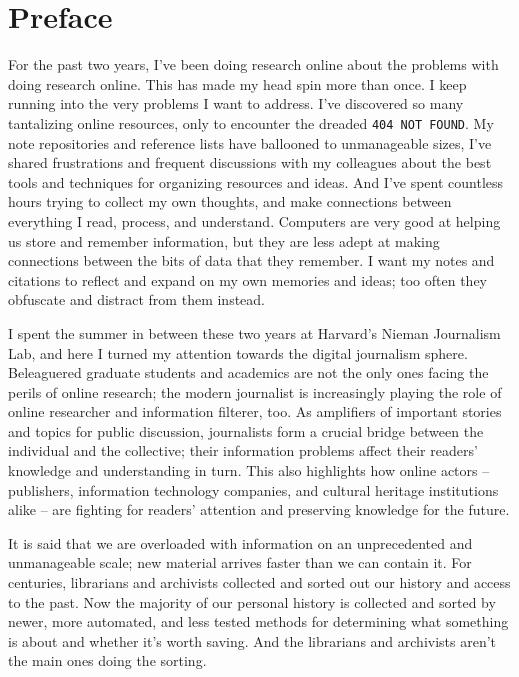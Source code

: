 \section{Preface}


For the past two years, I've been doing research online about the problems with doing research online. This has made my head spin more than once. I keep running into the very problems I want to address. I've discovered so many tantalizing online resources, only to encounter the dreaded \texttt{404 NOT FOUND}. My note repositories and reference lists have ballooned to unmanageable sizes, I've shared frustrations and frequent discussions with my colleagues about the best tools and techniques for organizing resources and ideas. And I've spent countless hours trying to collect my own thoughts, and make connections between everything I read, process, and understand. Computers are very good at helping us store and remember information, but they are less adept at making connections between the bits of data that they remember. I want my notes and citations to reflect and expand on my own memories and ideas; too often they obfuscate and distract from them instead.

I spent the summer in between these two years at Harvard's Nieman Journalism Lab, and here I turned my attention towards the digital journalism sphere. Beleaguered graduate students and academics are not the only ones facing the perils of online research; the modern journalist is increasingly playing the role of online researcher and information filterer, too. As amplifiers of important stories and topics for public discussion, journalists form a crucial bridge between the individual and the collective; their information problems affect their readers' knowledge and understanding in turn. This also highlights how online actors -- publishers, information technology companies, and cultural heritage institutions alike -- are fighting for readers' attention and preserving knowledge for the future.

It is said that we are overloaded with information on an unprecedented and unmanageable scale; new material arrives faster than we can contain it. For centuries, librarians and archivists collected and sorted out our history and access to the past. Now the majority of our personal history is collected and sorted by newer, more automated, and less tested methods for determining what something is about and whether it's worth saving. And the librarians and archivists aren't the main ones doing the sorting.

